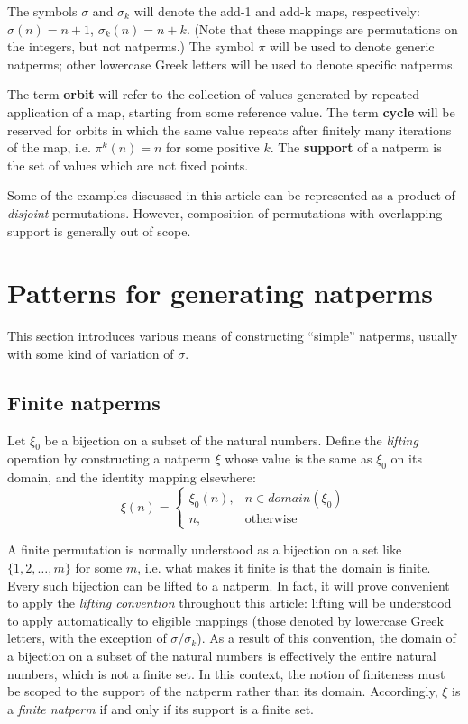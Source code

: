 \documentclass[12pt,reqno]{article}
\begin{document}
The symbols $\sigma$ and $\sigma_k$ will denote the add-1 and add-k maps, respectively: $\sigma(n) = n + 1$, $\sigma_k(n) = n + k$. (Note that these mappings are permutations on the integers, but not natperms.) The symbol $\pi$ will be used to denote generic natperms; other lowercase Greek letters will be used to denote specific natperms.

The term \textbf{orbit} will refer to the collection of values generated by repeated application of a map, starting from some reference value. The term \textbf{cycle} will be reserved for orbits in which the same value repeats after finitely many iterations of the map, i.e. $\pi^k(n) = n$ for some positive $k$. The \textbf{support} of a natperm is the set of values which are not fixed points. 

Some of the examples discussed in this article can be represented as a product of \textit{disjoint} permutations. However, composition of permutations with overlapping support is generally out of scope.

\section{Patterns for generating natperms}

This section introduces various means of constructing ``simple'' natperms, usually with some kind of variation of $\sigma$.

\subsection{Finite natperms}

Let $\xi_0$ be a bijection on a subset of the natural numbers. Define the \textit{lifting} operation by constructing a natperm $\xi$ whose value is the same as $\xi_0$ on its domain, and the identity mapping elsewhere:
\begin{equation}
  \xi(n) = \begin{cases}
    \xi_0(n), & n \in domain(\xi_0) \\
    n, & \text{otherwise}
  \end{cases}
\end{equation}

A finite permutation is normally understood as a bijection on a set like $\{ 1, 2, \ldots, m \}$ for some $m$, i.e. what makes it finite is that the domain is finite. Every such bijection can be lifted to a natperm. In fact, it will prove convenient to apply the \textit{lifting convention} throughout this article: lifting will be understood to apply automatically to eligible mappings (those denoted by lowercase Greek letters, with the exception of $\sigma$/$\sigma_k$). As a result of this convention, the domain of a bijection on a subset of the natural numbers is effectively the entire natural numbers, which is not a finite set. In this context, the notion of finiteness must be scoped to the support of the natperm rather than its domain. Accordingly, $\xi$ is a \textit{finite natperm} if and only if its support is a finite set.
\end{document}
